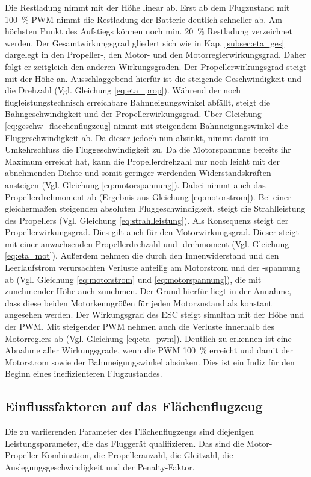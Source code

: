 Die Restladung nimmt mit der Höhe linear ab. Erst ab dem Flugzustand mit \SI{100}{\%} PWM nimmt die Restladung der Batterie deutlich schneller ab. Am höchsten Punkt des Aufstiegs können noch min. \SI{20}{\%} Restladung verzeichnet werden.
Der Gesamtwirkungsgrad gliedert sich wie in Kap. \ref{subsec:eta_ges} dargelegt in den Propeller-, den Motor- und den Motorreglerwirkungsgrad. Daher folgt er zeitgleich den anderen Wirkungsgraden. Der Propellerwirkungsgrad steigt mit der Höhe an. Ausschlaggebend hierfür ist die steigende Geschwindigkeit und die Drehzahl (Vgl. Gleichung \ref{eq:eta_prop}). Während der noch flugleistungstechnisch erreichbare Bahnneigungswinkel abfällt, steigt die Bahngeschwindigkeit und der Propellerwirkungsgrad. Über Gleichung \ref{eq:geschw_flaechenflugzeug} nimmt mit steigendem Bahnneigungswinkel die Fluggeschwindigkeit ab. Da dieser jedoch nun absinkt, nimmt damit im Umkehrschluss die Fluggeschwindigkeit zu. Da die Motorspannung bereits ihr Maximum erreicht hat, kann die Propellerdrehzahl nur noch leicht mit der abnehmenden Dichte und somit geringer werdenden Widerstandskräften ansteigen (Vgl. Gleichung \ref{eq:motorspannung}). Dabei nimmt auch das Propellerdrehmoment ab (Ergebnis aus Gleichung \ref{eq:motorstrom}). Bei einer gleichermaßen steigenden absoluten Fluggeschwindigkeit, steigt die Strahlleistung des Propellers (Vgl. Gleichung \ref{eq:strahlleistung}). Als Konsequenz steigt der Propellerwirkungsgrad.
Dies gilt auch für den Motorwirkungsgrad. Dieser steigt mit einer anwachsenden Propellerdrehzahl und -drehmoment (Vgl. Gleichung \ref{eq:eta_mot}). Außerdem nehmen die durch den Innenwiderstand und den Leerlaufstrom verursachten Verluste anteilig am Motorstrom und der -spannung ab (Vgl. Gleichung \ref{eq:motorstrom} und \ref{eq:motorspannung}), die mit zunehmender Höhe auch zunehmen. Der Grund hierfür liegt in der Annahme, dass diese beiden Motorkenngrößen für jeden Motorzustand als konstant angesehen werden. Der Wirkungsgrad des ESC steigt simultan mit der Höhe und der PWM. Mit steigender PWM nehmen auch die Verluste innerhalb des Motorreglers ab (Vgl. Gleichung \ref{eq:eta_pwm}). Deutlich zu erkennen ist eine Abnahme aller Wirkungsgrade, wenn die PWM \SI{100}{\%} erreicht und damit der Motorstrom sowie der Bahnneigungswinkel absinken. Dies ist ein Indiz für den Beginn eines ineffizienteren Flugzustandes.



\subsection{Einflussfaktoren auf das Flächenflugzeug}
Die zu variierenden Parameter des Flächenflugzeugs sind diejenigen Leistungsparameter, die das Fluggerät qualifizieren. Das sind die Motor-Propeller-Kombination, die Propelleranzahl, die Gleitzahl, die Auslegungsgeschwindigkeit und der Penalty-Faktor.

